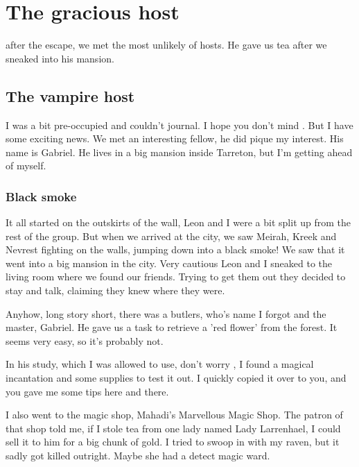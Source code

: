 \chapter{The gracious host}
\label{diary__gabriel}

 after the escape, we met the most unlikely of hosts. He gave us tea after we sneaked into his mansion.

\section{The vampire host}

I was a bit pre-occupied and couldn't journal. I hope you don't mind \Master{}. But I have some exciting news. We met an interesting fellow, he did pique my interest. His name is Gabriel. He lives in a big mansion inside Tarreton, but I'm getting ahead of myself.

\subsection*{Black smoke}

It all started on the outskirts of the wall, Leon and I were a bit split up from the rest of the group. But when we arrived at the city, we saw Meirah, Kreek and Nevrest fighting on the walls, jumping down into a black smoke! We saw that it went into a big mansion in the city. Very cautious Leon and I sneaked to the living room where we found our friends. Trying to get them out they decided to stay and talk, claiming they knew where they were.

Anyhow, long story short, there was a butlers, who's name I forgot and the master, Gabriel. He gave us a task to retrieve a 'red flower' from the forest. It seems very easy, so it's probably not.

In his study, which I was allowed to use, don't worry \Master{}, I found a magical incantation and some supplies to test it out. I quickly copied it over to you, and you gave me some tips here and there.

I also went to the magic shop, Mahadi's Marvellous Magic Shop. The patron of that shop told me, if I stole tea from one lady named Lady Larrenhael, I could sell it to him for a big chunk of gold. I tried to swoop in with my raven, but it sadly got killed outright. Maybe she had a detect magic ward.

